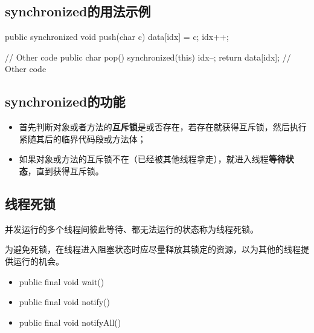 \subsection{synchronized的用法示例}


\begin{javaCode}
  public synchronized void push(char c) {
    data[idx] = c;
    idx++;
  }
\end{javaCode}


\begin{javaCode}
  // Other code
  public char pop() {
    synchronized(this) {
      idx--;
      return data[idx];
    }
    // Other code
  }
\end{javaCode}

\subsection{synchronized的功能}

\begin{itemize}\kai
\item 首先判断对象或者方法的{\bf\Red 互斥锁}是或否存在，若存在就获得互斥锁，然后执行紧随其后的临界代码段或方法体；
\item 如果对象或方法的互斥锁不在（已经被其他线程拿走），就进入线程{\bf\Blue 等待状态}，直到获得互斥锁。
\end{itemize}



\subsection{线程死锁}

并发运行的多个线程间彼此等待、都无法运行的状态称为{\hei\Blue 线程死锁}。

{\kai\Red 为避免死锁，在线程进入阻塞状态时应尽量释放其锁定的资源，以为其他的线程提供运行的机会。}


\begin{itemize}
\item public final void wait()
\item public final void notify()
\item public final void notifyAll()
\end{itemize}

